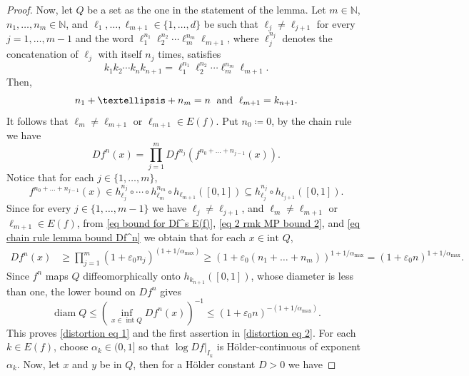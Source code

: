 \documentclass[10pt,a4paper]{amsart}
\numberwithin{equation}{section} %
\numberwithin{figure}{section} %
\newcommand{\N}{\mathbb{N}}
\renewcommand{\=}{\coloneqq}
\begin{document}
\begin{proof}
    Now, let $Q$ be a set as the one in the statement of the lemma.
    Let $m\in\N$, $n_1,\ldots,n_m\in \N$, and $\ell_1,\ldots,\ell_{m+1}\in \{1,\ldots,d\}$ be such that $\ell_j \neq \ell_{j+1}$ for every $j=1,\ldots,m-1$ and the word $\ell_{1}^{n_1} \ell_{2}^{n_2}\cdots \ell_{m}^{n_m}\ell_{m+1}$,  where $\ell_{j}^{n_j}$ denotes the concatenation of $\ell_j$ with itself $n_j$ times, satisfies
    \begin{equation}
        k_1k_2\cdots k_{n} k_{n+1} = \ell_{1}^{n_1} \ell_{2}^{n_2}\cdots \ell_{m}^{n_m}\ell_{m+1}.
    \end{equation}
    Then,
    \begin{equation}
        n_1+\ldots + n_m =n \text{\; and \;} \ell_{m+1}= k_{n+1}.
    \end{equation}
    It follows that $\ell_m\neq \ell_{m+1}$ or $\ell_{m+1}\in E(f)$. Put $n_0\=0$, by the chain rule we have 
    \begin{equation}\label{eq chain rule lemma bound Df^n}
        Df^n(x) = \prod_{j=1}^m Df^{n_j}(f^{n_0+\ldots + n_{j-1}}(x)).
    \end{equation}
    Notice that for each $j\in \{1,\ldots,m\}$,
    \begin{equation*}
        f^{n_0+\dots + n_{j-1}}(x) \in h_{\ell_j}^{n_j}\circ\cdots\circ h_{\ell_m}^{n_m} \circ h_{{\ell_{m+1}}}([0,1]) \subseteq h_{\ell_j}^{n_j}\circ h_{\ell_{j+1}}([0,1]).
    \end{equation*}
    Since for every $j\in \{1,\ldots,m-1\}$ we have $\ell_j \neq \ell_{j+1}$, and $\ell_m\neq \ell_{m+1}$ or $\ell_{m+1}\in E(f)$, from \eqref{eq bound for Df^s E(f)}, \eqref{eq 2 rmk MP bound 2}, and \eqref{eq chain rule lemma bound Df^n} we obtain that for each $x\in \text{int }Q$,
   \begin{equation*}
       \begin{split}
           Df^{n}(x) &\geq \prod_{j=1}^m (1+\varepsilon_0 n_j)^{(1+1/\alpha_{\max} )}\geq (1+\varepsilon_0(n_1+\ldots+n_m))^{1+1/\alpha_{\max}}= (1+\varepsilon_0 n)^{1+1/\alpha_{\max}}.
       \end{split}
   \end{equation*}
   Since $f^n$ maps $Q$ diffeomorphically onto $h_{k_{n+1}}([0,1])$, whose diameter is less than one, the lower bound on $Df^n$ gives
\begin{equation*}
\operatorname{diam} Q \le \left(\inf_{x\in\operatorname{int} Q} Df^n(x)\right)^{-1} \le (1+\varepsilon_0 n)^{-(1+1/\alpha_{\max})}.
\end{equation*}
 This proves \eqref{distortion eq 1} and the first assertion in \eqref{distortion eq 2}. For each $k\in E(f)$, choose $\alpha_k\in (0,1]$ so that $\log Df|_{I_k}$ is Hölder-continuous of exponent $\alpha_k$. Now, let $x$ and $y$ be in $Q$, then for a Hölder constant $D>0$ we have

\end{proof}
\end{document}
